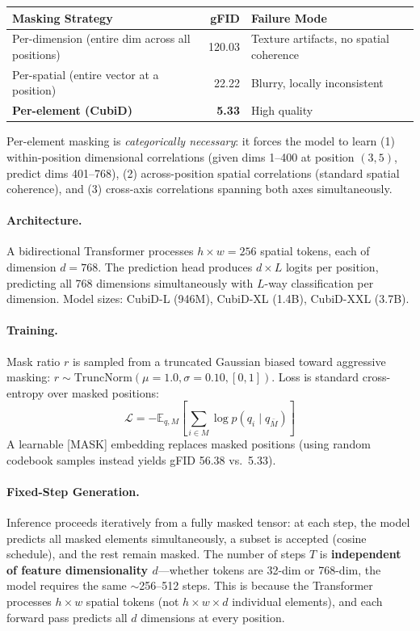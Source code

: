 \documentclass[11pt]{article}
\begin{document}
\begin{center}
\begin{tabular}{lrl}
\toprule
\textbf{Masking Strategy} & \textbf{gFID} & \textbf{Failure Mode} \\
\midrule
Per-dimension (entire dim across all positions) & 120.03 & Texture artifacts, no spatial coherence \\
Per-spatial (entire vector at a position) & 22.22 & Blurry, locally inconsistent \\
\textbf{Per-element (CubiD)} & \textbf{5.33} & High quality \\
\bottomrule
\end{tabular}
\end{center}

Per-element masking is \emph{categorically necessary}: it forces the model to learn (1) within-position dimensional correlations (given dims 1--400 at position $(3,5)$, predict dims 401--768), (2) across-position spatial correlations (standard spatial coherence), and (3) cross-axis correlations spanning both axes simultaneously.

\paragraph{Architecture.}
A bidirectional Transformer processes $h \times w = 256$ spatial tokens, each of dimension $d\!=\!768$.
The prediction head produces $d \times L$ logits per position, predicting all 768 dimensions simultaneously with $L$-way classification per dimension.
Model sizes: CubiD-L (946M), CubiD-XL (1.4B), CubiD-XXL (3.7B).

\paragraph{Training.}
Mask ratio $r$ is sampled from a truncated Gaussian biased toward aggressive masking: $r \sim \mathrm{TruncNorm}(\mu\!=\!1.0, \sigma\!=\!0.10, [0, 1])$.
Loss is standard cross-entropy over masked positions:
\[
\mathcal{L} = -\mathbb{E}_{q, M}\left[\sum_{i \in M} \log p(q_i \mid q_{\bar{M}})\right]
\]
A learnable [MASK] embedding replaces masked positions (using random codebook samples instead yields gFID 56.38 vs.\ 5.33).

\paragraph{Fixed-Step Generation.}
Inference proceeds iteratively from a fully masked tensor: at each step, the model predicts all masked elements simultaneously, a subset is accepted (cosine schedule), and the rest remain masked.
The number of steps $T$ is \textbf{independent of feature dimensionality $d$}---whether tokens are 32-dim or 768-dim, the model requires the same $\sim$256--512 steps.
This is because the Transformer processes $h \times w$ spatial tokens (not $h \times w \times d$ individual elements), and each forward pass predicts all $d$ dimensions at every position.
\end{document}
